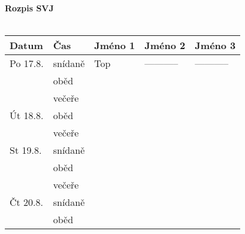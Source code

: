 \documentclass[12pt, a4paper, landscape]{article}
\begin{document}
\begin{multicols}{2}
		\textbf{\huge Rozpis SVJ}
		\\
		\\	
		\begin{tabular}{ | p{} p{} | p{}|  p{}| p{}|}
			\hline
			Datum & Čas & Jméno 1 & Jméno 2 & Jméno 3 \\ \hline
			Po 17.8. & snídaně & Top & ----------- & -----------  \\ \hline
			 & oběd & & &  \\ \hline
			 & večeře & & &  \\ \hline
			\hline
			Út 18.8. & oběd & & &  \\ \hline
			 & večeře & & &  \\ \hline
			\hline
			St 19.8. & snídaně & & &  \\ \hline
			 & oběd & & &  \\ \hline
			 & večeře & & &  \\ \hline
			\hline
			Čt 20.8. & snídaně & & &  \\ \hline
			 & oběd & & &  \\ \hline			
		\end{tabular}
	
	\end{multicols}
\end{document}
